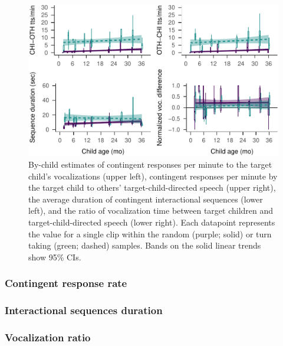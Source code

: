 \documentclass[floatsintext,man]{apa6}
\theoremstyle{definition}
\theoremstyle{definition}
\theoremstyle{definition}
\theoremstyle{remark}
\begin{document}
\begin{figure}
\centering
\includegraphics{Tseltal-CLE_files/figure-latex/fig3-1.pdf}
\caption{\label{fig:fig3}By-child estimates of contingent responses per
minute to the target child's vocalizations (upper left), contingent
responses per minute by the target child to others'
target-child-directed speech (upper right), the average duration of
contingent interactional sequences (lower left), and the ratio of
vocalization time between target children and target-child-directed
speech (lower right). Each datapoint represents the value for a single
clip within the random (purple; solid) or turn taking (green; dashed)
samples. Bands on the solid linear trends show 95\% CIs.}
\end{figure}

\subsubsection{Contingent response rate}\label{contingent-response-rate}

\subsubsection{Interactional sequences
duration}\label{interactional-sequences-duration}

\subsubsection{Vocalization ratio}\label{vocalization-ratio}
\end{document}
